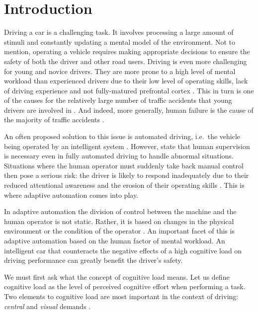 
\section{Introduction}\label{sec:introduction}

Driving a car is a challenging task. 
It involves processing a large amount of stimuli and constantly updating a mental model of the environment.
Not to mention, operating a vehicle requires making appropriate decisions to ensure the safety of both the driver and other road users.
Driving is even more challenging for young and novice drivers. 
They are more prone to a high level of mental workload than experienced drivers due to their low level of operating skills, lack of driving experience \citep{Gregersen1996} and not fully-matured prefrontal cortex \citep{Ross2014}.
This in turn is one of the causes for the relatively large number of traffic accidents that young drivers are involved in \citep{Sena2013}.
And indeed, more generally, human failure is the cause of the majority of traffic accidents \citep{DeWaard1996}.

An often proposed solution to this issue is automated driving, i.e.\ the vehicle being operated by an intelligent system \citep{Cabrall2018}.
However, \citet{Brookhuis2007} state that human supervision is necessary even in fully automated driving to handle abnormal situations.
Situations where the human operator must suddenly take back manual control then pose a serious risk:
the driver is likely to respond inadequately due to their reduced attentional awareness and the erosion of their operating skills \citep{Dijksterhuis2012}.
This is where adaptive automation comes into play.

In adaptive automation the division of control between the machine and the human operator is not static.
Rather, it is based on changes in the physical environment or the condition of the operator \citep{Sheridan2011}.
An important facet of this is adaptive automation based on the human factor of mental workload.
An intelligent car that counteracts the negative effects of a high cognitive load on driving performance can greatly benefit the driver's safety.

We must first ask what the concept of cognitive load means.
Let us define cognitive load as the level of perceived cognitive effort when performing a task.
Two elements to cognitive load are most important in the context of driving: \textit{central} and \textit{visual} demands \citep{DeWaard1996}. 

